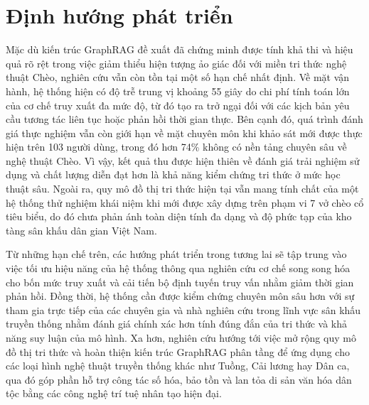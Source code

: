 \section{Định hướng phát triển}
Mặc dù kiến trúc GraphRAG đề xuất đã chứng minh được tính khả thi và hiệu quả rõ rệt trong việc giảm thiểu hiện tượng ảo giác đối với miền tri thức nghệ thuật Chèo, nghiên cứu vẫn còn tồn tại một số hạn chế nhất định. Về mặt vận hành, hệ thống hiện có độ trễ trung vị khoảng 55 giây do chi phí tính toán lớn của cơ chế truy xuất đa mức độ, từ đó tạo ra trở ngại đối với các kịch bản yêu cầu tương tác liên tục hoặc phản hồi thời gian thực. Bên cạnh đó, quá trình đánh giá thực nghiệm vẫn còn giới hạn về mặt chuyên môn khi khảo sát mới được thực hiện trên 103 người dùng, trong đó hơn 74\% không có nền tảng chuyên sâu về nghệ thuật Chèo. Vì vậy, kết quả thu được hiện thiên về đánh giá trải nghiệm sử dụng và chất lượng diễn đạt hơn là khả năng kiểm chứng tri thức ở mức học thuật sâu. Ngoài ra, quy mô đồ thị tri thức hiện tại vẫn mang tính chất của một hệ thống thử nghiệm khái niệm khi mới được xây dựng trên phạm vi 7 vở chèo cổ tiêu biểu, do đó chưa phản ánh toàn diện tính đa dạng và độ phức tạp của kho tàng sân khấu dân gian Việt Nam.

Từ những hạn chế trên, các hướng phát triển trong tương lai sẽ tập trung vào việc tối ưu hiệu năng của hệ thống thông qua nghiên cứu cơ chế song song hóa cho bốn mức truy xuất và cải tiến bộ định tuyến truy vấn nhằm giảm thời gian phản hồi. Đồng thời, hệ thống cần được kiểm chứng chuyên môn sâu hơn với sự tham gia trực tiếp của các chuyên gia và nhà nghiên cứu trong lĩnh vực sân khấu truyền thống nhằm đánh giá chính xác hơn tính đúng đắn của tri thức và khả năng suy luận của mô hình. Xa hơn, nghiên cứu hướng tới việc mở rộng quy mô đồ thị tri thức và hoàn thiện kiến trúc GraphRAG phân tầng để ứng dụng cho các loại hình nghệ thuật truyền thống khác như Tuồng, Cải lương hay Dân ca, qua đó góp phần hỗ trợ công tác số hóa, bảo tồn và lan tỏa di sản văn hóa dân tộc bằng các công nghệ trí tuệ nhân tạo hiện đại.